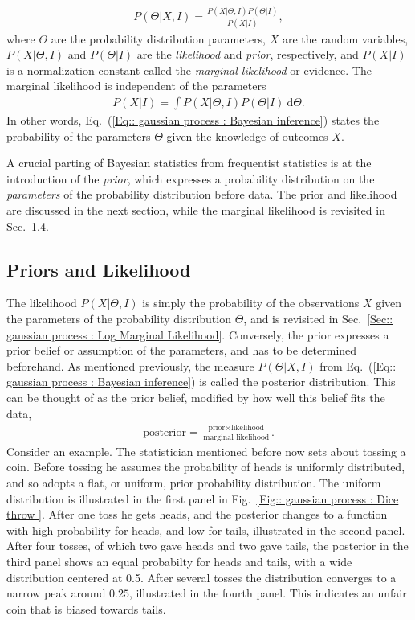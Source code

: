 \documentclass[twoside,english]{uiofysmaster}
\begin{document}
{\begin{align}\label{Eq:: gaussian process : Bayesian inference}
P(\Theta | X , I) = \frac{P(X|\Theta, I) P(\Theta| I)}{P(X | I)},
\end{align}
where $\Theta$ are the probability distribution parameters, $X$ are the random variables, $P(X|\Theta, I)$  and $P(\Theta |I)$ are the \textit{likelihood} and \textit{prior}, respectively, and $P(X|I)$ is a normalization constant called the \textit{marginal likelihood} or evidence. The marginal likelihood is independent of the parameters
\begin{align}
P(X|I) = \int P(X| \Theta, I) P(\Theta | I)~ \text{d} \Theta.
\end{align}
In other words, Eq.~(\ref{Eq:: gaussian process : Bayesian inference}) states the probability of the parameters $\Theta$ given the knowledge of outcomes $X$.

A crucial parting of Bayesian statistics from frequentist statistics is at the introduction of the \textit{prior}, which expresses a probability distribution on the \textit{parameters} of the probability distribution before data. The prior and likelihood are discussed in the next section, while the marginal likelihood is revisited in Sec.~1.4.

\subsection{Priors and Likelihood}\label{Sec:: gaussian process : Priors and Likelihood}

The likelihood $P(X |\Theta, I)$ is simply the probability of the observations $X$ given the parameters of the probability distribution $\Theta$, and is revisited in Sec.~\ref{Sec:: gaussian process : Log Marginal Likelihood}. Conversely, the prior expresses a prior belief or assumption of the parameters, and has to be determined beforehand. As mentioned previously, the measure $P(\Theta | X , I)$ from Eq.~(\ref{Eq:: gaussian process : Bayesian inference}) is called the posterior distribution. This can be thought of as the prior belief, modified by how well this belief fits the data,
\begin{align*}
\text{posterior} = \frac{\text{prior} \times \text{likelihood}}{\text{marginal likelihood}}.
\end{align*}
Consider an example. The statistician mentioned before now sets about tossing a coin. Before tossing he assumes the probability of heads is uniformly distributed, and so adopts a flat, or uniform, prior probability distribution. The uniform distribution is illustrated in the first panel in Fig.~\ref{Fig:: gaussian process : Dice throw }. After one toss he gets heads, and the posterior changes to a function with high probability for heads, and low for tails, illustrated in the second panel. After four tosses, of which two gave heads and two gave tails, the posterior in the third panel shows an equal probabilty for heads and tails, with a wide distribution centered at 0.5. After several tosses the distribution converges to a narrow peak around $0.25$, illustrated in the fourth panel. This indicates an unfair coin that is biased towards tails.

}
\end{document}
